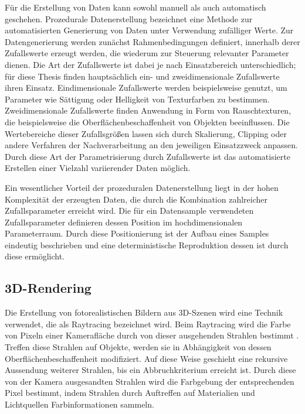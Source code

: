 Für die Erstellung von Daten kann sowohl manuell als auch automatisch geschehen. Prozedurale Datenerstellung bezeichnet eine Methode zur automatisierten Generierung von Daten unter Verwendung zufälliger Werte. Zur Datengenerierung werden zunächst Rahmenbedingungen definiert, innerhalb derer Zufallswerte erzeugt werden, die wiederum zur Steuerung relevanter Parameter dienen. Die Art der Zufallswerte ist dabei je nach Einsatzbereich unterschiedlich; für diese Thesis finden hauptsächlich ein- und zweidimensionale Zufallswerte ihren Einsatz. Eindimensionale Zufallswerte werden beispielsweise genutzt, um Parameter wie Sättigung oder Helligkeit von Texturfarben zu bestimmen. Zweidimensionale Zufallswerte finden Anwendung in Form von Rauschtexturen, die beispielsweise die Oberflächenbeschaffenheit von Objekten beeinflussen. Die Wertebereiche dieser Zufallsgrößen lassen sich durch Skalierung, Clipping oder andere Verfahren der Nachverarbeitung an den jeweiligen Einsatzzweck anpassen. Durch diese Art der Parametrisierung durch Zufallswerte ist das automatisierte Erstellen einer Vielzahl variierender Daten möglich.

Ein wesentlicher Vorteil der prozeduralen Datenerstellung liegt in der hohen Komplexität der erzeugten Daten, die durch die Kombination zahlreicher Zufallsparameter erreicht wird. Die für ein Datensample verwendeten Zufallsparameter definieren dessen Position im hochdimensionalen Parameterraum. Durch diese Positionierung ist der Aufbau eines Samples eindeutig beschrieben und eine deterministische Reproduktion dessen ist durch diese ermöglicht.


\subsection{3D-Rendering}
\label{sec:3d_rendering}

Die Erstellung von fotorealistischen Bildern aus 3D-Szenen wird eine Technik verwendet, die als Raytracing bezeichnet wird. Beim Raytracing wird die Farbe von Pixeln einer Kamerafläche durch von dieser ausgehenden Strahlen bestimmt \cite{ray_tracing,ray_tracing_distributed,ray_tracing_equations}. Treffen diese Strahlen auf Objekte, werden sie in Abhängigkeit von dessen Oberflächenbeschaffenheit modifiziert. Auf diese Weise geschieht eine rekursive Aussendung weiterer Strahlen, bis ein Abbruchkriterium erreicht ist. Durch diese von der Kamera ausgesandten Strahlen wird die Farbgebung der entsprechenden Pixel bestimmt, indem Strahlen durch Auftreffen auf Materialien und Lichtquellen Farbinformationen sammeln.

